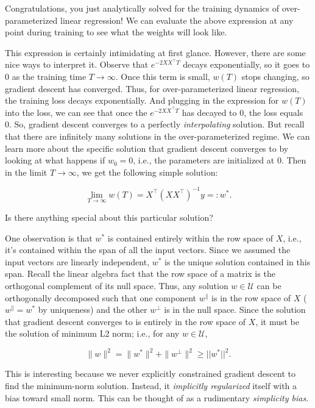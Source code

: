 Congratulations, you just analytically solved for the training dynamics of over-parameterized linear regression! We can evaluate the above expression at any point during training to see what the weights will look like.

This expression is certainly intimidating at first glance. However, there are some nice ways to interpret it. Observe that $e^{-2XX^\top T}$ decays exponentially, so it goes to 0 as the training time $T \to \infty$. Once this term is small, $w(T)$ stops changing, so gradient descent has converged. Thus, for over-parameterized linear regression, the training loss decays exponentially. And plugging in the expression for $w(T)$ into the loss, we can see that once the $e^{-2XX^\top T}$ has decayed to 0, the loss equals 0. So, gradient descent converges to a perfectly \textit{interpolating} solution. But recall that there are infinitely many solutions in the over-parameterized regime. We can learn more about the specific solution that gradient descent converges to by looking at what happens if $w_0=0$, i.e., the parameters are initialized at 0. Then in the limit $T\to \infty$, we get the following simple solution:

\begin{equation}
    \lim_{T\to \infty} w(T) = X^\top(XX^\top)^{-1}y =:w^*.
    \label{linregsoln}
\end{equation}

Is there anything special about this particular solution? 

One observation is that $w^*$ is contained entirely within the row space of $X$, i.e., it's contained within the span of all the input vectors. Since we assumed the input vectors are linearly independent, $w^*$ is the unique solution contained in this span. Recall the linear algebra fact that the row space of a matrix is the orthogonal complement of its null space. Thus, any solution $w\in \mathcal{U}$ can be orthogonally decomposed such that one component $w^\parallel$ is in the row space of $X$ ($w^\parallel=w^*$ by uniqueness) and the other $w^\perp$ is in the null space. Since the solution that gradient descent converges to is entirely in the row space of $X$, it must be the solution of minimum L2 norm; i.e., for any $w \in \mathcal{U}$,

$$
\|w\|^2 = \|w^*\|^2 + \|w^\perp\|^2 \geq ||w^*||^2.
$$

This is interesting because we never explicitly constrained gradient descent to find the minimum-norm solution. Instead, it \textit{implicitly regularized} itself with a bias toward small norm. This can be thought of as a rudimentary \textit{simplicity bias}.

